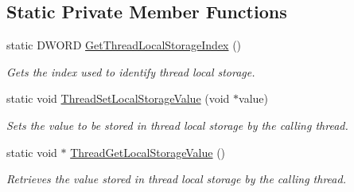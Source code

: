 \subsection*{Static Private Member Functions}
\begin{DoxyCompactItemize}
\item 
static DWORD \hyperlink{class_thread_single_abcc5041a5e19e0cc168bc2dc05624232}{GetThreadLocalStorageIndex} ()
\begin{DoxyCompactList}\small\item\em Gets the index used to identify thread local storage. \item\end{DoxyCompactList}\item 
static void \hyperlink{class_thread_single_afac20b84be21ce171288a8322165a5d4}{ThreadSetLocalStorageValue} (void $\ast$value)
\begin{DoxyCompactList}\small\item\em Sets the value to be stored in thread local storage by the calling thread. \item\end{DoxyCompactList}\item 
static void $\ast$ \hyperlink{class_thread_single_aaf1ad7a2ce1e68aac5d0fe1821970423}{ThreadGetLocalStorageValue} ()
\begin{DoxyCompactList}\small\item\em Retrieves the value stored in thread local storage by the calling thread. \item\end{DoxyCompactList}\end{DoxyCompactItemize}
